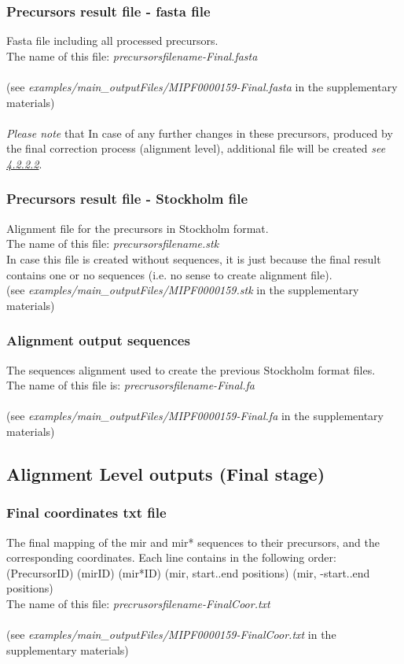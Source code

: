 \documentclass[a4paper,20pt]{report}
\begin{document}
\subsubsection{Precursors result file - fasta file}
\noindent
Fasta file including all processed precursors. \\
The name of this file:  \textit{precursorsfilename-Final.fasta}\\\\
(see \textit{examples/main\_outputFiles/MIPF0000159-Final.fasta} in the supplementary materials)\\\\
\textit{Please note} that In case of any further changes in these precursors, produced by the final correction 
process (alignment level), additional file will be created \textit{see \hyperref[sec:corrfile]{4.2.2.2}}.

\subsubsection{Precursors result file - Stockholm file}
\noindent
Alignment file for the precursors in Stockholm format.\\
The name of this file: \textit{precursorsfilename.stk}\\
In case this file is created without sequences, it is just because the final result contains one or no sequences 
(i.e. no sense to create alignment file).\\
(see \textit{examples/main\_outputFiles/MIPF0000159.stk} in the supplementary materials)

\subsubsection{Alignment output sequences}
\noindent
The sequences alignment used to create the previous Stockholm format files.\\
The name of this file is:  \textit{precrusorsfilename-Final.fa}\\\\
\noindent
(see \textit{examples/main\_outputFiles/MIPF0000159-Final.fa} 
in the supplementary materials)
\subsection{Alignment Level outputs (Final stage)}

\subsubsection{Final coordinates txt file}
\label{sec:finalcoor}
\noindent
The final mapping of the mir and mir* sequences to their precursors, and the corresponding coordinates.
Each line contains in the following order: \\
(PrecursorID) (mirID) (mir*ID) (mir, start..end positions) (mir, -start..end positions)\\
The name of this file: \textit{precrusorsfilename-FinalCoor.txt}\\\\
(see \textit{examples/main\_outputFiles/MIPF0000159-FinalCoor.txt} in the supplementary materials)
\end{document}
